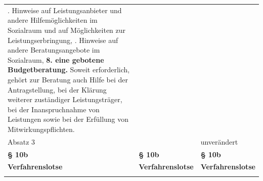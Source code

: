 \documentclass[10pt,a4paper,landscape]{article}
\begin{document}
\begin{longtable}{|L{8.2cm}|L{8.2cm}|L{8.2cm}|}
. Hinweise auf Leistungsanbieter und  \newline andere Hilfemöglichkeiten im Sozialraum  und auf Möglichkeiten zur  \newline Leistungserbringung,   . Hinweise auf andere Beratungsangebote  \newline im \textcolor{diffgreen}{Sozialraum,} \newline \textbf{\textcolor{diffgreen}{8. eine gebotene Budgetberatung.}} Soweit erforderlich, gehört zur Beratung  \newline auch Hilfe bei der Antragstellung, bei der  \newline Klärung weiterer zuständiger  \newline Leistungsträger, bei der Inanspruchnahme  \newline von Leistungen sowie bei der Erfüllung von  \newline Mitwirkungspflichten. \\
\hhline{|---|}
Absatz 3 &  & unverändert \\
\hhline{|---|}
\textbf{\S{} 10b} & \textbf{\S{} 10b} & \textbf{\S{} 10b} \\
\hhline{|---|}
\textbf{Verfahrenslotse} & \textbf{Verfahrenslotse} & \textbf{Verfahrenslotse} \\
\hhline{|---|}

\end{longtable}
\end{document}
